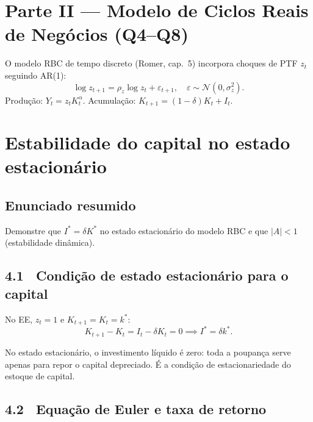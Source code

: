 \documentclass[12pt, a4paper]{article}
\newcommand{\kstar}{k^*}
\begin{document}

\newpage
\section*{\large\color{cyanrbc} Parte II --- Modelo de Ciclos Reais de Negócios (Q4--Q8)}

O modelo RBC de tempo discreto (Romer, cap.\ 5) incorpora choques de PTF $z_t$
seguindo AR(1):
\[
\log z_{t+1} = \rho_z \log z_t + \varepsilon_{t+1}, \quad
\varepsilon \sim \mathcal{N}(0,\sigma_z^2).
\]
Produção: $Y_t = z_t K_t^\alpha$. Acumulação: $K_{t+1} = (1-\delta)K_t + I_t$.

\section{Estabilidade do capital no estado estacionário}

\subsection*{Enunciado resumido}
Demonstre que $I^*=\delta K^*$ no estado estacionário do modelo RBC e que $|A|<1$
(estabilidade dinâmica).

\subsection*{4.1 \ Condição de estado estacionário para o capital}

No EE, $z_t=1$ e $K_{t+1}=K_t=\kstar$:
\[
K_{t+1} - K_t = I_t - \delta K_t = 0 \implies I^* = \delta\kstar.
\]

\begin{resultbox}[title={Interpretação de $I^*=\delta K^*$}]
No estado estacionário, o investimento líquido é zero: toda a poupança serve apenas
para repor o capital depreciado. É a condição de estacionariedade do estoque de capital.
\end{resultbox}

\subsection*{4.2 \ Equação de Euler e taxa de retorno}
\end{document}
